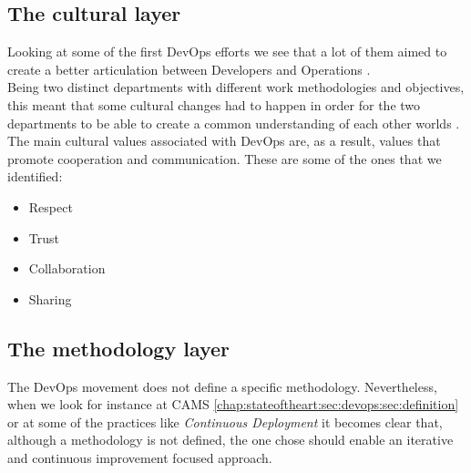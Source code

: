       \subsection{The cultural layer} \label{chap:stateoftheart:sec:devops:sec:culture}
      Looking at some of the first DevOps efforts we see that a lot of them aimed to create a better articulation between Developers and Operations \cite{Debois2008} \cite{Allspaw}.\\
      Being two distinct departments with different work methodologies and objectives, this meant that some cultural changes had to happen in order for the two departments to be able to create a common understanding of each other worlds \cite{Allspaw}.\\
      The main cultural values associated with DevOps are, as a result, values that promote cooperation and communication. These are some of the ones that we identified:
      \begin{itemize}
          \item Respect \cite{Davis2015} \cite{Allspaw}
          \item Trust \cite{Huttermann2012}
          \item Collaboration \cite{Davis2015}
          \item Sharing \cite{Willis2010}
      \end{itemize}

      \subsection{The methodology layer} \label{chap:stateoftheart:sec:devops:sec:methodology}
      The DevOps movement does not define a specific methodology. Nevertheless, when we look for instance at CAMS \ref{chap:stateoftheart:sec:devops:sec:definition} or at some of the practices like \textit{Continuous Deployment} it becomes clear that, although a methodology is not defined, the one chose should enable an iterative and continuous improvement focused approach.

